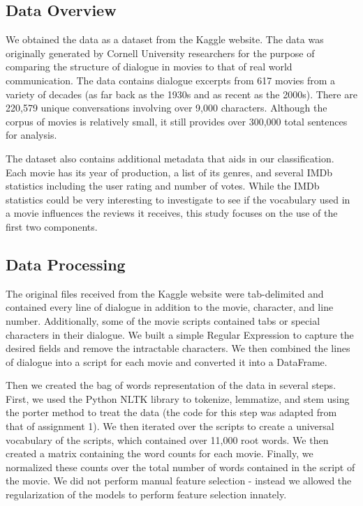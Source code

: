 \documentclass{article} %
\begin{document}
\subsection{Data Overview}

We obtained the data as a dataset from the Kaggle website. The data was originally generated by Cornell University researchers for the purpose of comparing the structure of dialogue in movies to that of real world communication. The data contains dialogue excerpts from 617 movies from a variety of decades (as far back as the 1930s and as recent as the 2000s). There are 220,579 unique conversations involving over 9,000 characters. Although the corpus of movies is relatively small, it still provides over 300,000 total sentences for analysis. \cite{kaggle}

The dataset also contains additional metadata that aids in our classification. Each movie has its year of production, a list of its genres, and several IMDb statistics including the user rating and number of votes. While the IMDb statistics could be very interesting to investigate to see if the vocabulary used in a movie influences the reviews it receives, this study focuses on the use of the first two components.

\subsection{Data Processing}

The original files received from the Kaggle website were tab-delimited and contained every line of dialogue in addition to the movie, character, and line number. Additionally, some of the movie scripts contained tabs or special characters in their dialogue. We built a simple Regular Expression to capture the desired fields and remove the intractable characters. We then combined the lines of dialogue into a script for each movie and converted it into a DataFrame.

Then we created the bag of words representation of the data in several steps. First, we used the Python NLTK library to tokenize, lemmatize, and stem using the porter method to treat the data (the code for this step was adapted from that of assignment 1). We then iterated over the scripts to create a universal vocabulary of the scripts, which contained over 11,000 root words. We then created a matrix containing the word counts for each movie. Finally, we normalized these counts over the total number of words contained in the script of the movie. We did not perform manual feature selection - instead we allowed the regularization of the models to perform feature selection innately.
\end{document}
